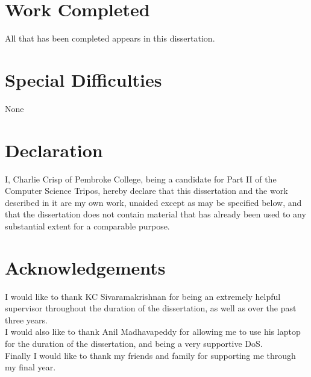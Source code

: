 \documentclass[12pt,a4paper,twoside,openright]{report}
\begin{document}
	
	\section*{Work Completed}
	
	All that has been completed appears in this dissertation.
	
	\section*{Special Difficulties}
	
	None
	 
	\newpage
	\section*{Declaration}
	
	I, Charlie Crisp of Pembroke College, being a candidate for Part II of the Computer
	Science Tripos, hereby declare that this dissertation and the work described in it are my own work,
	unaided except as may be specified below, and that the dissertation
	does not contain material that has already been used to any substantial
	extent for a comparable purpose.
	
	\bigskip
	\bigskip
	
	\tableofcontents
	
	\listoffigures
	
	\newpage
	\section*{Acknowledgements}
	
	I would like to thank KC Sivaramakrishnan for being an extremely helpful supervisor throughout the duration of the dissertation, as well as over the past three years.\\
	I would also like to thank Anil Madhavapeddy for allowing me to use his laptop for the duration of the dissertation, and being a very supportive DoS.\\
	Finally I would like to thank my friends and family for supporting me through my final year.
	
	
	\pagestyle{headings}
	
\end{document}
